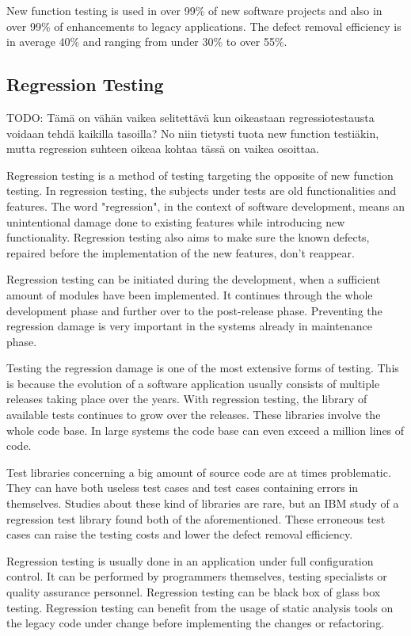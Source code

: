 New function testing is used in over 99\% of new software projects and also in over 99\% of enhancements to legacy applications. The defect removal efficiency is in average 40\% and ranging from under 30\% to over 55\%. 

 \subsection{Regression Testing}

TODO: Tämä on vähän vaikea selitettävä kun oikeastaan regressiotestausta voidaan tehdä kaikilla tasoilla? No niin tietysti tuota new function testiäkin, mutta regression suhteen oikeaa kohtaa tässä on vaikea osoittaa.

Regression testing is a method of testing targeting the opposite of new function testing. In regression testing, the subjects under tests are old functionalities and features. The word "regression", in the context of software development, means an unintentional damage done to existing features while introducing new functionality. Regression testing also aims to make sure the known defects, repaired before the implementation of the new features, don't reappear.

Regression testing can be initiated during the development, when a sufficient amount of modules have been implemented. It continues through the whole development phase and further over to the post-release phase. Preventing the regression damage is very important in the systems already in maintenance phase.

Testing the regression damage is one of the most extensive forms of testing. This is because the evolution of a software application usually consists of multiple releases taking place over the years. With regression testing, the library of available tests continues to grow over the releases. These libraries involve the whole code base. In large systems the code base can even exceed a million lines of code.

Test libraries concerning a big amount of source code are at times problematic. They can have both useless test cases and test cases containing errors in themselves. Studies about these kind of libraries are rare, but an IBM study of a regression test library found both of the aforementioned. These erroneous test cases can raise the testing costs and lower the defect removal efficiency.

Regression testing is usually done in an application under full configuration control. It can be performed by programmers themselves, testing specialists or quality assurance personnel. Regression testing can be black box of glass box testing. Regression testing can benefit from the usage of static analysis tools on the legacy code under change before implementing the changes or refactoring.

